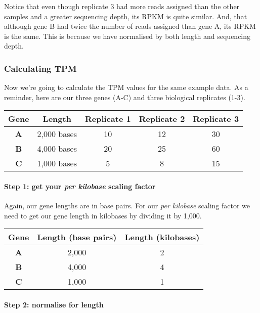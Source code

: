 \documentclass[11pt]{article}
\begin{document}
Notice that even though replicate 3 had more reads assigned than the
other samples and a greater sequencing depth, its RPKM is quite similar.
And, that although gene B had twice the number of reads assigned than
gene A, its RPKM is the same. This is because we have normalised by both
length and sequencing depth.

\newpage

    \hypertarget{calculating-tpm}{%
\subsubsection{Calculating TPM}\label{calculating-tpm}}

Now we're going to calculate the TPM values for the same example data.
As a reminder, here are our three genes (A-C) and three biological
replicates (1-3).

\begin{longtable}[]{@{}ccccc@{}}
\hline
Gene & Length & Replicate 1 & Replicate 2 & Replicate 3\tabularnewline
\hline
\endhead
\textbf{A} & 2,000 bases & 10 & 12 & 30\tabularnewline
\textbf{B} & 4,000 bases & 20 & 25 & 60\tabularnewline
\textbf{C} & 1,000 bases & 5 & 8 & 15\tabularnewline
\hline
\end{longtable}

\hypertarget{step-1-get-your-per-kilobase-scaling-factor}{%
\paragraph{\texorpdfstring{Step 1: get your \textit{per kilobase} scaling
factor}{Step 1: get your per kilobase scaling factor}}\label{step-1-get-your-per-kilobase-scaling-factor}}

Again, our gene lengths are in base pairs. For our \textit{per kilobase}
scaling factor we need to get our gene length in kilobases by dividing
it by 1,000.

\begin{longtable}[]{@{}ccc@{}}
\hline
Gene & Length (base pairs) & Length (kilobases)\tabularnewline
\hline
\endhead
\textbf{A} & 2,000 & 2\tabularnewline
\textbf{B} & 4,000 & 4\tabularnewline
\textbf{C} & 1,000 & 1\tabularnewline
\hline
\end{longtable}

\hypertarget{step-2-normalise-for-length}{%
\paragraph{Step 2: normalise for
length}\label{step-2-normalise-for-length}}
\end{document}
